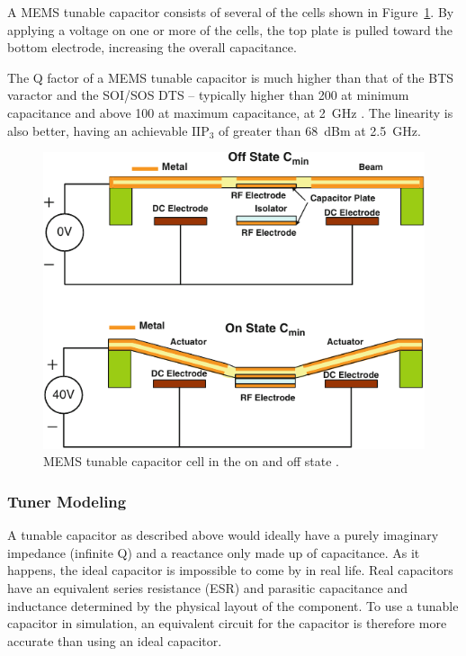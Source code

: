 A MEMS tunable capacitor consists of several of the cells shown in Figure~\ref{fig:memscap}. By applying a voltage on one or more of the cells, the top plate is pulled toward the bottom electrode, increasing the overall capacitance. 

The Q factor of a MEMS tunable capacitor is much higher than that of the BTS varactor and the SOI/SOS DTS -- typically higher than 200 at minimum capacitance and above 100 at maximum capacitance, at \SI{2}{GHz} \cite{gu2014rf}. The linearity is also better, having an achievable $\text{IIP}_3$ of greater than \SI{68}{dBm} at \SI{2.5}{GHz}. 

\begin{figure}[htbp]
    \centering
    \includegraphics{img/analysis/memscap}
    \caption{MEMS tunable capacitor cell in the on and off state \cite{gu2014rf}.}
    \label{fig:memscap}
\end{figure}

\subsubsection{Tuner Modeling}
A tunable capacitor as described above would ideally have a purely imaginary impedance (infinite Q) and a reactance only made up of capacitance. As it happens, the ideal capacitor is impossible to come by in real life. Real capacitors have an equivalent series resistance (ESR) and parasitic capacitance and inductance determined by the physical layout of the component. To use a tunable capacitor in simulation, an equivalent circuit for the capacitor is therefore more accurate than using an ideal capacitor.

